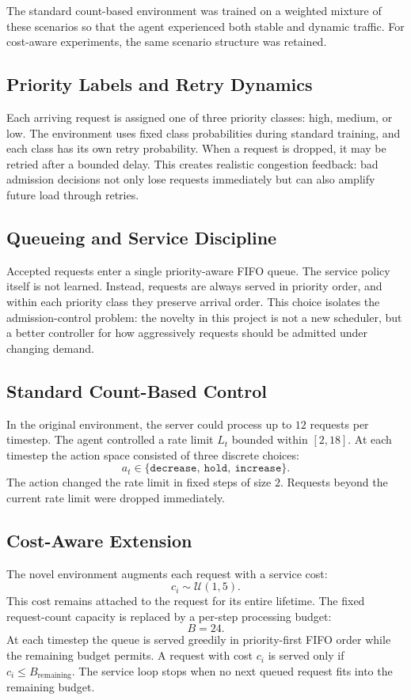 \documentclass[conference]{IEEEtran}
\begin{document}
The standard count-based environment was trained on a weighted mixture of these scenarios so that the agent experienced both stable and dynamic traffic. For cost-aware experiments, the same scenario structure was retained.

\subsection{Priority Labels and Retry Dynamics}
Each arriving request is assigned one of three priority classes: high, medium, or low. The environment uses fixed class probabilities during standard training, and each class has its own retry probability. When a request is dropped, it may be retried after a bounded delay. This creates realistic congestion feedback: bad admission decisions not only lose requests immediately but can also amplify future load through retries.

\subsection{Queueing and Service Discipline}
Accepted requests enter a single priority-aware FIFO queue. The service policy itself is not learned. Instead, requests are always served in priority order, and within each priority class they preserve arrival order. This choice isolates the admission-control problem: the novelty in this project is not a new scheduler, but a better controller for how aggressively requests should be admitted under changing demand.

\subsection{Standard Count-Based Control}
In the original environment, the server could process up to $12$ requests per timestep. The agent controlled a rate limit $L_t$ bounded within $[2,18]$. At each timestep the action space consisted of three discrete choices:
\[
a_t \in \{\texttt{decrease},\ \texttt{hold},\ \texttt{increase}\}.
\]
The action changed the rate limit in fixed steps of size $2$. Requests beyond the current rate limit were dropped immediately.

\subsection{Cost-Aware Extension}
The novel environment augments each request with a service cost:
\[
c_i \sim \mathcal{U}(1,5).
\]
This cost remains attached to the request for its entire lifetime. The fixed request-count capacity is replaced by a per-step processing budget:
\[
B = 24.
\]
At each timestep the queue is served greedily in priority-first FIFO order while the remaining budget permits. A request with cost $c_i$ is served only if $c_i \leq B_{\text{remaining}}$. The service loop stops when no next queued request fits into the remaining budget.
\end{document}
